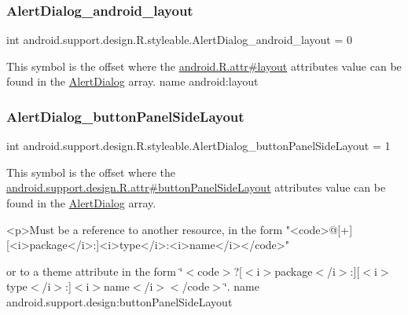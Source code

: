 \subsubsection{\texorpdfstring{Alert\+Dialog\+\_\+android\+\_\+layout}{AlertDialog\_android\_layout}}
{\footnotesize\ttfamily int android.\+support.\+design.\+R.\+styleable.\+Alert\+Dialog\+\_\+android\+\_\+layout = 0\hspace{0.3cm}{\ttfamily [static]}}

This symbol is the offset where the \hyperlink{}{android.\+R.\+attr\#layout} attribute\textquotesingle{}s value can be found in the \hyperlink{classandroid_1_1support_1_1design_1_1R_1_1styleable_aeccb758d25f6e242e6f3a23f3873ec21}{Alert\+Dialog} array.  name android\+:layout \mbox{\label{classandroid_1_1support_1_1design_1_1R_1_1styleable_a91b90d0ee4293fa8574bdff3e999127f}} 
\subsubsection{\texorpdfstring{Alert\+Dialog\+\_\+button\+Panel\+Side\+Layout}{AlertDialog\_buttonPanelSideLayout}}
{\footnotesize\ttfamily int android.\+support.\+design.\+R.\+styleable.\+Alert\+Dialog\+\_\+button\+Panel\+Side\+Layout = 1\hspace{0.3cm}{\ttfamily [static]}}

This symbol is the offset where the \hyperlink{classandroid_1_1support_1_1design_1_1R_1_1attr_a0aa2e5b25e72f55f310faf2342f1cfaa}{android.\+support.\+design.\+R.\+attr\#button\+Panel\+Side\+Layout} attribute\textquotesingle{}s value can be found in the \hyperlink{classandroid_1_1support_1_1design_1_1R_1_1styleable_aeccb758d25f6e242e6f3a23f3873ec21}{Alert\+Dialog} array.

\begin{DoxyVerb}      <p>Must be a reference to another resource, in the form "<code>@[+][<i>package</i>:]<i>type</i>:<i>name</i></code>"
\end{DoxyVerb}
 or to a theme attribute in the form \char`\"{}$<$code$>$?\mbox{[}$<$i$>$package$<$/i$>$\+:\mbox{]}\mbox{[}$<$i$>$type$<$/i$>$\+:\mbox{]}$<$i$>$name$<$/i$>$$<$/code$>$\char`\"{}.  name android.\+support.\+design\+:button\+Panel\+Side\+Layout \mbox{\label{classandroid_1_1support_1_1design_1_1R_1_1styleable_afa996611e1e7845aac83c49748a573b9}} 
